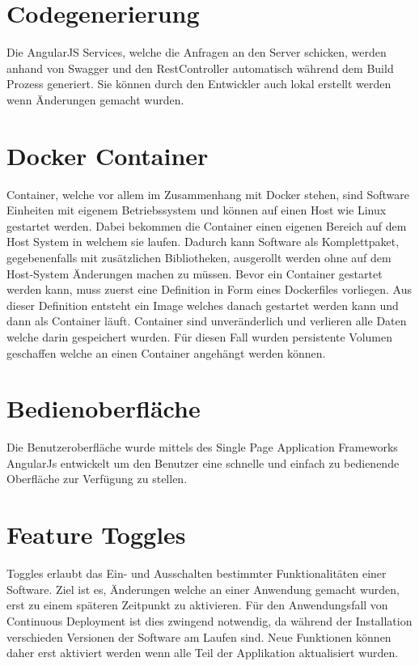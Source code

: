 \section{Codegenerierung}

Die AngularJS Services, welche die Anfragen an den Server schicken, werden anhand von Swagger und den RestController automatisch während dem Build Prozess generiert. Sie können durch den Entwickler auch lokal erstellt werden wenn Änderungen gemacht wurden.

\section{Docker Container}
\label{container}
Container, welche vor allem im Zusammenhang mit Docker stehen, sind Software Einheiten mit eigenem Betriebssystem und können auf einen Host wie Linux gestartet werden. Dabei bekommen die Container einen eigenen Bereich auf dem Host System in welchem sie laufen. Dadurch kann Software als Komplettpaket, gegebenenfalls mit zusätzlichen Bibliotheken, ausgerollt werden ohne auf dem Host-System Änderungen machen zu müssen. \newline
Bevor ein Container gestartet werden kann, muss zuerst eine Definition in Form eines Dockerfiles vorliegen. Aus dieser Definition entsteht ein Image welches danach gestartet werden kann und dann als Container läuft. Container sind unveränderlich und verlieren alle Daten welche darin gespeichert wurden. Für diesen Fall wurden persistente Volumen geschaffen welche an einen Container angehängt werden können.

\section{Bedienoberfläche}

Die Benutzeroberfläche wurde mittels des Single Page Application Frameworks AngularJs entwickelt um den Benutzer eine schnelle und einfach zu bedienende Oberfläche zur Verfügung zu stellen. 

\section{Feature Toggles}
\label{toggles}

Toggles erlaubt das Ein- und Ausschalten bestimmter Funktionalitäten einer Software. Ziel ist es, Änderungen welche an einer Anwendung gemacht wurden, erst zu einem späteren Zeitpunkt zu aktivieren. Für den Anwendungsfall von Continuous Deployment ist dies zwingend notwendig, da während der Installation verschieden Versionen der Software am Laufen sind. Neue Funktionen können daher erst aktiviert werden wenn alle Teil der Applikation aktualisiert wurden.

